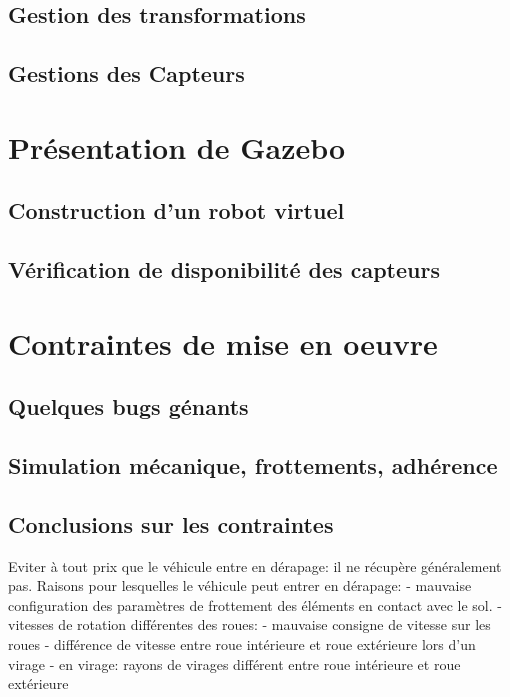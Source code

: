 \documentclass[12pt,a4paper]{report}
\begin{document}
		\subsection{Gestion des transformations}
		\subsection{Gestions des Capteurs}
		
	\section{Présentation de Gazebo}
	
		\subsection{Construction d'un robot virtuel}
		
		
		\subsection{Vérification de disponibilité des capteurs}
		
	\section{Contraintes de mise en oeuvre}
		\subsection{Quelques bugs génants}
		\subsection{Simulation mécanique, frottements, adhérence}
		\subsection{Conclusions sur les contraintes}
		Eviter à tout prix que le véhicule entre en dérapage: il ne récupère généralement pas.
		Raisons pour lesquelles le véhicule peut entrer en dérapage:
			- mauvaise configuration des paramètres de frottement des éléments en contact avec le sol.
			- vitesses de rotation différentes des roues: 
				- mauvaise consigne de vitesse sur les roues
				- différence de vitesse entre roue intérieure et roue extérieure lors d'un virage
			- en virage: rayons de virages différent entre roue intérieure et roue extérieure
			
\end{document}
